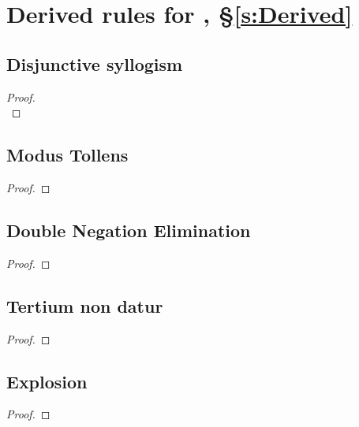\section*{Derived rules for \TFL, §\ref{s:Derived}}
\begin{multicols}{3}
\subsection*{Disjunctive syllogism}
\begin{proof}

\\	
\end{proof}

\subsection*{Modus Tollens}

\begin{proof}
	 
\end{proof}

\subsection*{Double Negation Elimination}


	\begin{proof}
	\end{proof}

\subsection*{Tertium non datur}
	\begin{proof}
		\open
		\close
		\open
		\close
	\end{proof}

\subsection*{Explosion}
	\begin{proof}
	\end{proof}


\end{multicols}
